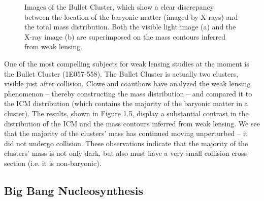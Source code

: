 \documentclass{report}
\begin{document}
\begin{figure}
    \centering
    \caption{Images of the Bullet Cluster, which show a clear discrepancy between the location of the baryonic matter (imaged by X-rays) and the total mass distribution. Both the visible light image (a) and the X-ray image (b) are superimposed on the mass contours inferred from weak lensing.}
\end{figure}

One of the most compelling subjects for weak lensing studies at the moment is the Bullet Cluster (1E057-558). The Bullet Cluster is actually two clusters, visible just after collision. Clowe and coauthors have analyzed the weak lensing phenomenon -- thereby constructing the mass distribution -- and compared it to the ICM distribution (which contains the majority of the baryonic matter in a cluster). The results, shown in Figure 1.5, display a substantial contrast in the distribution of the ICM and the mass contours inferred from weak lensing. We see that the majority of the clusters' mass has continued moving unperturbed -- it did not undergo collision. These observations indicate that the majority of the clusters' mass is not only dark, but also must have a very small collision cross-section (i.e. it is non-baryonic).

\subsection{Big Bang Nucleosynthesis}
\end{document}
